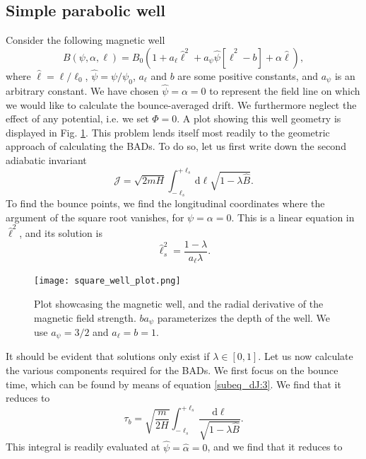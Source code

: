\subsection{Simple parabolic well}
Consider the following magnetic well
\begin{equation}
    B(\psi,\alpha,\ell) = B_0 \left(1 + a_\ell \hat{\ell}^2  + a_\psi \hat{\psi} \left[ \hat{\ell}^2 - b \right] + \alpha \hat{\ell} \right),
\end{equation}
where $\hat{\ell} = \ell / \ell_0$, $\hat{\psi}=\psi/\psi_0$, $a_\ell$ and $b$ are some positive constants, and $a_\psi$ is an arbitrary constant. We have chosen $\hat{\psi}=\alpha=0$ to represent the field line on which we would like to calculate the bounce-averaged drift. We furthermore neglect the effect of any potential, i.e. we set $\Phi = 0$. A plot showing this well geometry is displayed in Fig. \ref{fig:square_well_plot}.
This problem lends itself most readily to the geometric approach of calculating the BADs. To do so, let us first write down the second adiabatic invariant
\begin{equation}
    \mathcal{J} = \sqrt{2mH} \int_{-\ell_s}^{+\ell_s} \mathrm{d} \ell \sqrt{1 - \lambda \hat{B} }.
\end{equation}
To find the bounce points, we find the longitudinal coordinates where the argument of the square root vanishes, for $\psi=\alpha=0$. This is a linear equation in $\hat{\ell}^2$, and its solution is
\begin{equation}
    \hat{\ell}_s^2 = \frac{1-\lambda}{a_\ell \lambda}.
\end{equation}
\begin{figure}
    \centering
    \texttt{[image: square\_well\_plot.png]}
    \caption{Plot showcasing the magnetic well, and the radial derivative of the magnetic field strength. $b a_\psi$ parameterizes the depth of the well. We use $a_\psi = 3/2$ and $ a_\ell = b = 1$.}
    \label{fig:square_well_plot}
\end{figure}
It should be evident that solutions only exist if $\lambda \in [0,1]$. Let us now calculate the various components required for the BADs. We first focus on the bounce time, which can be found by means of equation \eqref{subeq_dJ:3}. We find that it reduces to 
\begin{equation}
    \tau_b = \sqrt{\frac{m}{2H}} \int_{-\ell_s}^{+\ell_s} \frac{\mathrm{d} \ell}{\sqrt{1 - \lambda \hat{B}}}.
    \label{eq:bounce-time}
\end{equation}
This integral is readily evaluated at $\hat{\psi}=\hat{\alpha}=0$, and we find that it reduces to
